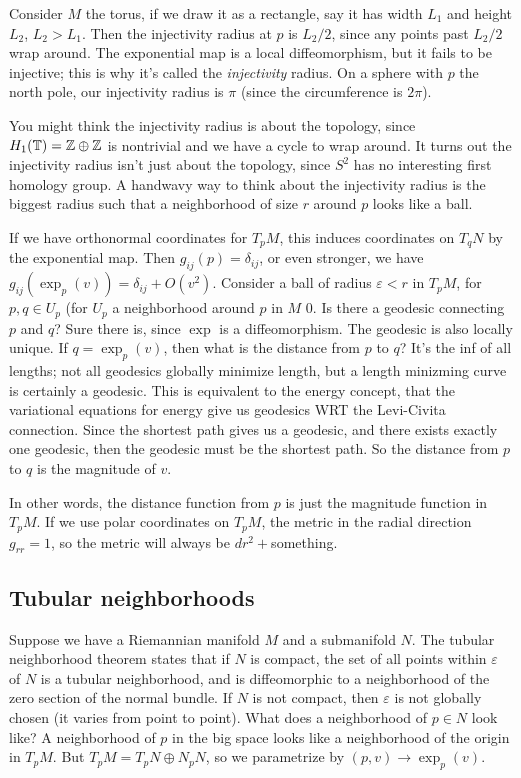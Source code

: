  \begin{example}
     Consider $M$ the torus, if we draw it as a rectangle, say it has width $L_1$ and height $L_2$, $L_2>L_1$. Then the injectivity radius at $p$ is $L_2 /2$, since any points past $L_2 /2$ wrap around. The exponential map is a local diffeomorphism, but it fails to be injective; this is why it's called the \emph{injectivity} radius. On a sphere with $p$ the north pole, our injectivity radius is $\pi$ (since the circumference is $2\pi$).
\end{example}
You might think the injectivity radius is about the topology, since $H_1(\mathbb{T})=\mathbb{Z}\oplus \mathbb{Z}$ is nontrivial and we have a cycle to wrap around. It turns out the injectivity radius isn't just about the topology, since $S^2$ has no interesting first homology group. A handwavy way to think about the injectivity radius is the biggest radius such that a neighborhood of size $r$ around $p$ looks like a ball.

If we have orthonormal coordinates for $T_p M$, this induces coordinates on $T_q N$ by the exponential map. Then $g_{ij}(p)=\delta _{ij}$, or even stronger, we have $g_{ij}(\exp_p(v))=\delta _{ij}+O(v^2)$. Consider a ball of radius $\varepsilon <r$ in $T_p M$, for $p,q \in U_p$ (for $U_p$ a neighborhood around $p$ in $M$ 0. Is there a geodesic connecting $p$ and $q$? Sure there is, since $\exp$ is a diffeomorphism. The geodesic is also locally unique. If $q=\exp_p(v)$, then what is the distance from $p$ to $q$? It's the inf of all lengths; not all geodesics globally minimize length, but a length minizming curve is certainly a geodesic. This is equivalent to the energy concept, that the variational equations for energy give us geodesics WRT the Levi-Civita connection. Since the shortest path gives us a geodesic, and there exists exactly one geodesic, then the geodesic must be the shortest path. So the distance from $p $ to $q$ is the magnitude of $v$.

In other words, the distance function from $p$ is just the magnitude function in $T_p M$. If we use polar coordinates on $T_p M$, the metric in the radial direction $g_{rr}=1$, so the metric will always be $dr^2+$something.

\subsection{Tubular neighborhoods}
Suppose we have a Riemannian manifold $M$ and a submanifold $N$. The tubular neighborhood theorem states that if $N$ is compact, the set of all points within $\varepsilon $ of $N$ is a tubular neighborhood, and is diffeomorphic to a neighborhood of the zero section of the normal bundle. If $N$ is not compact, then $\varepsilon $ is not globally chosen (it varies from point to point). What does a neighborhood of $p \in  N$ look like? A neighborhood of $p$ in the big space looks like a neighborhood of the origin in $T_pM$. But $T_pM=T_p N\oplus N_p N$, so we parametrize by $(p,v) \to \exp_p (v)$.
    
